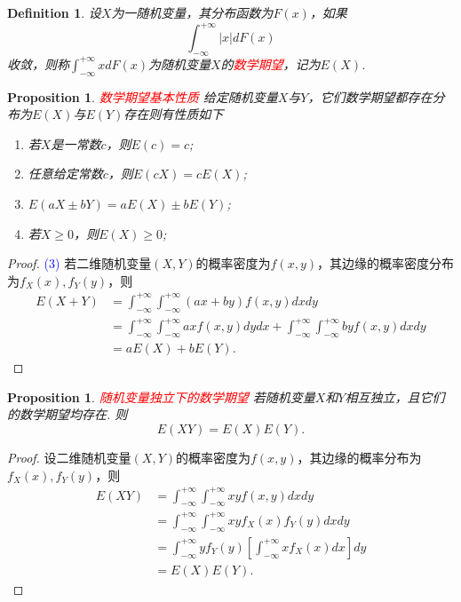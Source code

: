 \documentclass{article}
\newtheorem{proposition}[theorem]{Proposition}
\newtheorem{definition}[theorem]{Definition}
\newcommand{\redt}[1]{\textcolor{red}{#1}}
\newcommand{\bluet}[1]{\textcolor{blue}{#1}}
\begin{document}
\begin{definition}
\rm 设$X$为一随机变量，其分布函数为$F(x)$，如果
$$
\int_{-\infty}^{+\infty} |x|dF(x)
$$
收敛，则称$\int_{-\infty}^{+\infty} xdF(x)$为随机变量$X$的\redt{数学期望}，记为$E(X)$. 
\end{definition}

\begin{proposition}
\rm \redt{数学期望基本性质} 给定随机变量$X$与$Y$，它们数学期望都存在分布为$E(X)$与$E(Y)$存在则有性质如下
\begin{enumerate}
	\item 若$X$是一常数$c$，则$E(c) = c$;
	\item 任意给定常数$c$，则$E(cX) = cE(X)$;
	\item $E(aX \pm bY) = aE(X)\pm bE(Y)$;
	\item 若$X \geq 0$，则$E(X) \geq 0$;
\end{enumerate}
\end{proposition}

\begin{proof}
\bluet{(3)} 若二维随机变量$(X,Y)$的概率密度为$f(x,y)$，其边缘的概率密度分布为$f_X(x),f_Y(y)$，则
$$
\begin{array}{ll}
E(X+Y)&=\int_{-\infty}^{+\infty}\int_{-\infty}^{+\infty}(ax+by)f(x,y)dxdy \\
&= \int_{-\infty}^{+\infty}\int_{-\infty}^{+\infty}axf(x,y)dydx + \int_{-\infty}^{+\infty}\int_{-\infty}^{+\infty}byf(x,y)dxdy \\
&= aE(X) + bE(Y).
\end{array}
$$
\end{proof}

\begin{proposition}\label{expectation: independent}
\rm \redt{随机变量独立下的数学期望} 若随机变量$X$和$Y$相互独立，且它们的数学期望均存在. 则
$$
E(XY)=E(X)E(Y).
$$
\end{proposition}

\begin{proof}
\rm 设二维随机变量$(X,Y)$的概率密度为$f(x,y)$，其边缘的概率分布为$f_X(x),f_Y(y)$，则
$$
\begin{array}{ll}
E(XY) &= \int_{-\infty}^{+\infty}\int_{-\infty}^{+\infty} xyf(x,y)dxdy \\
&= \int_{-\infty}^{+\infty}\int_{-\infty}^{+\infty} xyf_X(x)f_Y(y)dxdy \\
&= \int_{-\infty}^{+\infty}yf_Y(y)\left[\int_{-\infty}^{+\infty}xf_X(x)dx\right]dy\\
&=E(X)E(Y).
\end{array}
$$
\end{proof}
\end{document}
